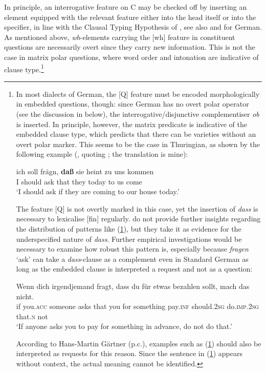 In principle, an interrogative feature on C may be checked off by inserting an element equipped with the relevant feature either into the head itself or into the specifier, in line with the Clausal Typing Hypothesis of \citet{cheng1991diss}, see also \citet[89]{bayerbrandner2008} and \citet[86]{zimmermann2013} for German. As mentioned above, \textit{wh}-elements carrying the [wh] feature in constituent questions are necessarily overt since they carry new information. This is not the case in matrix polar questions, where word order and intonation are indicative of clause type.\footnote{In most dialects of German, the [Q] feature must be encoded morphologically in embedded questions, though: since German has no overt polar operator (see the discussion in  below), the interrogative/disjunctive complementiser \textit{ob} is inserted. In principle, however, the matrix predicate is indicative of the embedded clause type, which predicts that there can be varieties without an overt polar marker. This seems to be the case in Thuringian, as shown by the following example (\citealt[24, ex. 34]{schallertdroegepheiff2018}, quoting \citealt{loeschfahningwiegand1990}; the translation is mine):

\ea \gll ich soll frägn, \textbf{daß} sie heint zu uns kommen \label{dassint}\\
I should ask that they today to us come\\
\glt `I should ask if they are coming to our house today.'
\z

The feature [Q] is not overtly marked in this case, yet the insertion of \textit{dass} is necessary to lexicalise [fin] regularly. \citet[24]{schallertdroegepheiff2018} do not provide further insights regarding the distribution of patterns like (\ref{dassint}), but they take it as evidence for the underspecified nature of \textit{dass}. Further empirical investigations would be necessary to examine how robust this pattern is, especially because \textit{fragen} `ask' can take a \textit{dass}-clause as a complement even in Standard German as long as the embedded clause is interpreted a request and not as a question:

\ea \gll Wenn dich irgendjemand fragt, dass du für etwas bezahlen sollt, mach das nicht.\\
if you.\textsc{acc} someone asks that you for something pay.\textsc{inf} should.\textsc{2sg} do.\textsc{imp.2sg} that.\textsc{n} not\\
\glt `If anyone asks you to pay for something in advance, do not do that.'
\z

According to Hans-Martin Gärtner (p.c.), examples such as (\ref{dassint}) should also be interpreted as requests for this reason. Since the sentence in (\ref{dassint}) appears without context, the actual meaning cannot be identified.}

